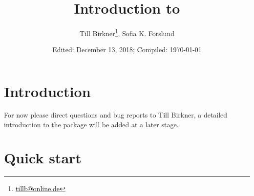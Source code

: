 \documentclass{article}\usepackage[]{graphicx}\usepackage[usenames,dvipsnames]{color}
\title{Introduction to \metadeconfoundR}
\author{Till Birkner\footnote{\url{tillb@online.de}}, Sofia K. Forslund}
\date{Edited: December 13, 2018; Compiled: \today}
\begin{document}
\maketitle

\tableofcontents

\section{Introduction}
%
 For now please direct questions and bug reports to Till Birkner, a detailed introduction to the package will be added at a later stage.

\section{Quick start}
\end{document}
